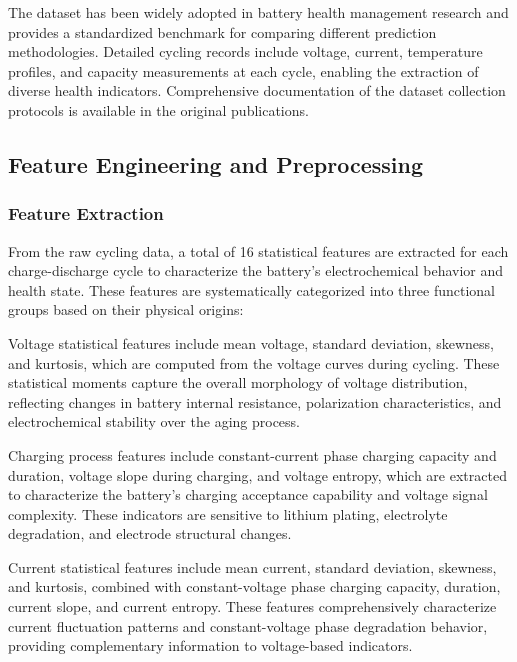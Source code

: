 \documentclass[5p,times]{elsarticle}
\begin{document}
The dataset has been widely adopted in battery health management research and provides a standardized benchmark for comparing different prediction methodologies. Detailed cycling records include voltage, current, temperature profiles, and capacity measurements at each cycle, enabling the extraction of diverse health indicators. Comprehensive documentation of the dataset collection protocols is available in the original publications.

\subsection{Feature Engineering and Preprocessing}\label{sec:features}

\subsubsection{Feature Extraction}

From the raw cycling data, a total of 16 statistical features are extracted for each charge-discharge cycle to characterize the battery's electrochemical behavior and health state. These features are systematically categorized into three functional groups based on their physical origins:

Voltage statistical features include mean voltage, standard deviation, skewness, and kurtosis, which are computed from the voltage curves during cycling. These statistical moments capture the overall morphology of voltage distribution, reflecting changes in battery internal resistance, polarization characteristics, and electrochemical stability over the aging process.

Charging process features include constant-current phase charging capacity and duration, voltage slope during charging, and voltage entropy, which are extracted to characterize the battery's charging acceptance capability and voltage signal complexity. These indicators are sensitive to lithium plating, electrolyte degradation, and electrode structural changes.

Current statistical features include mean current, standard deviation, skewness, and kurtosis, combined with constant-voltage phase charging capacity, duration, current slope, and current entropy. These features comprehensively characterize current fluctuation patterns and constant-voltage phase degradation behavior, providing complementary information to voltage-based indicators.
\end{document}
